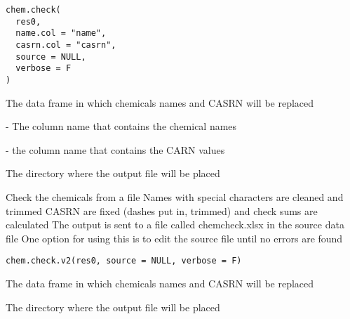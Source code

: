 \documentclass[letterpaper]{book}
\begin{document}
%
\begin{Usage}
\begin{verbatim}
chem.check(
  res0,
  name.col = "name",
  casrn.col = "casrn",
  source = NULL,
  verbose = F
)
\end{verbatim}
\end{Usage}
%
\begin{Arguments}
\begin{ldescription}
\item[\code{res0}] The data frame in which chemicals names and CASRN will be replaced

\item[\code{name.col}] - The column name that contains the chemical names

\item[\code{casrn.col}] - the column name that contains the CARN values

\item[\code{indir}] The directory where the output file will be placed
\end{ldescription}
\end{Arguments}
%
\begin{Description}\relax
Check the chemicals from a file
Names with special characters are cleaned and trimmed
CASRN are fixed (dashes put in, trimmed) and check sums are calculated
The output is sent to a file called chemcheck.xlsx in the source data file
One option for using this is to edit the source file until no errors are found
\end{Description}
%
\begin{Usage}
\begin{verbatim}
chem.check.v2(res0, source = NULL, verbose = F)
\end{verbatim}
\end{Usage}
%
\begin{Arguments}
\begin{ldescription}
\item[\code{res0}] The data frame in which chemicals names and CASRN will be replaced

\item[\code{indir}] The directory where the output file will be placed
\end{ldescription}
\end{Arguments}
\end{document}
